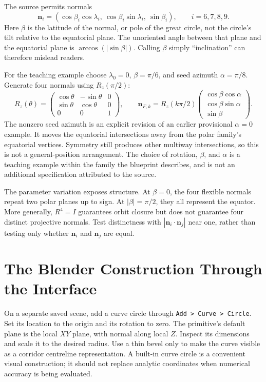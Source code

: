 The source permits normals
\[
  \mathbf n_i=(\cos\beta_i\cos\lambda_i,\ \cos\beta_i\sin\lambda_i,\ \sin\beta_i),
  \qquad i=6,7,8,9.
\]
Here $\beta$ is the latitude of the normal, or pole of the great circle, not the circle's tilt relative to the equatorial plane. The unoriented angle between that plane and the equatorial plane is $\arccos(|\sin\beta|)$. Calling $\beta$ simply ``inclination'' can therefore mislead readers.

For the teaching example choose $\lambda_0=0$, $\beta=\pi/6$, and seed azimuth $\alpha=\pi/8$. Generate four normals using $R_z(\pi/2)$:
\[
  R_z(\theta)=\begin{pmatrix}
    \cos\theta&-\sin\theta&0\\
    \sin\theta&\cos\theta&0\\
    0&0&1
  \end{pmatrix},\qquad
  \mathbf n_{F,k}=R_z(k\pi/2)
  \begin{pmatrix}\cos\beta\cos\alpha\\ \cos\beta\sin\alpha\\ \sin\beta\end{pmatrix}.
\]
The nonzero seed azimuth is an explicit revision of an earlier provisional $\alpha=0$ example. It moves the equatorial intersections away from the polar family's equatorial vertices. Symmetry still produces other multiway intersections, so this is not a general-position arrangement. The choice of rotation, $\beta$, and $\alpha$ is a teaching example within the family the blueprint describes, and is not an additional specification attributed to the source.

The parameter variation exposes structure. At $\beta=0$, the four flexible normals repeat two polar planes up to sign. At $|\beta|=\pi/2$, they all represent the equator. More generally, $R^4=I$ guarantees orbit closure but does not guarantee four distinct projective normals. Test distinctness with $|\mathbf n_i\cdot\mathbf n_j|$ near one, rather than testing only whether $\mathbf n_i$ and $\mathbf n_j$ are equal.

\section{The Blender Construction Through the Interface}

On a separate saved scene, add a curve circle through \texttt{Add > Curve > Circle}. Set its location to the origin and its rotation to zero. The primitive's default plane is the local $XY$ plane, with normal along local $Z$. Inspect its dimensions and scale it to the desired radius. Use a thin bevel only to make the curve visible as a corridor centreline representation. A built-in curve circle is a convenient visual construction; it should not replace analytic coordinates when numerical accuracy is being evaluated.

